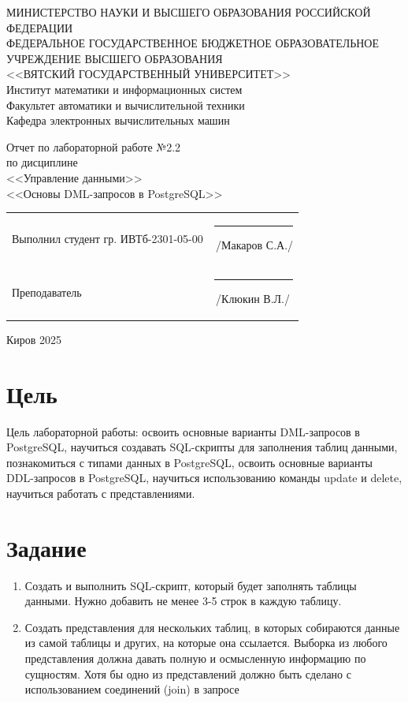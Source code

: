 \documentclass[a4paper,14pt]{extarticle}
\begin{document}
  \newpage\thispagestyle{empty}
  \begin{center}
    \MakeUppercase{
      Министерство науки и высшего образования Российской Федерации\\
      Федеральное государственное бюджетное образовательное учреждение высшего образования\\
      <<Вятский Государственный Университет>>\\
    }
    Институт математики и информационных систем\\
    Факультет автоматики и вычислительной техники\\
    Кафедра электронных вычислительных машин
  \end{center}
  \vfill

  \begin{center}
    Отчет по лабораторной работе №2.2\\
    по дисциплине\\
    <<Управление данными>>\\
    <<Основы DML-запросов в PostgreSQL>>\\
  \end{center}
  \vfill

  \noindent
  \begin{tabular}{ll}
    Выполнил студент гр. ИВТб-2301-05-00 \hspace{5mm} &
    \rule[-1mm]{25mm}{0.10mm}\,/Макаров С.А./\\
    
    Преподаватель & \rule[-1mm]{25mm}{0.10mm}\,/Клюкин В.Л./\\
  \end{tabular}

  \vfill
  \begin{center}
    Киров 2025
  \end{center}

  \newpage
  \section*{Цель}
  Цель лабораторной работы: освоить основные варианты DML-запросов в PostgreSQL, научиться создавать SQL-скрипты для заполнения таблиц данными, познакомиться с типами данных в PostgreSQL, освоить основные варианты DDL-запросов в PostgreSQL, научиться использованию команды update и delete, научиться работать с представлениями.

  \section*{Задание}
  \begin{enumerate}
    \item Создать и выполнить SQL-скрипт, который будет заполнять таблицы данными. Нужно добавить не менее 3-5 строк в каждую таблицу.
    \item Создать представления для нескольких таблиц, в которых собираются данные из самой таблицы и других, на которые она ссылается. Выборка из любого представления должна давать полную и осмысленную информацию по сущностям. Хотя бы одно из представлений должно быть сделано с использованием соединений (join) в запросе
  \end{enumerate}
\end{document}
